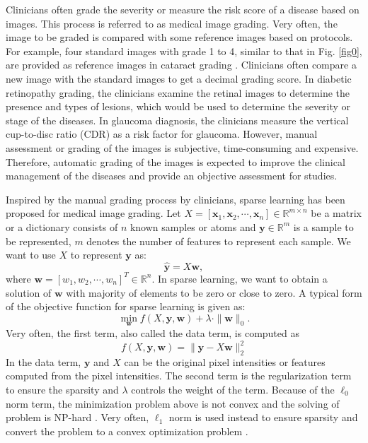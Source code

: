 \documentclass[journal]{IEEEtran}
\begin{document}
  Clinicians  often   grade the severity or measure the risk score of a disease  based on images. This process is referred to as medical image grading.  Very often, the image to be graded is compared with some reference images  based on protocols. For example, four standard images with grade 1 to 4, similar to that in Fig. \ref{fig0}, are provided as reference images in cataract grading \cite{Xu13}. Clinicians often compare a new image with  the standard images to get a decimal grading score. In diabetic retinopathy grading, the clinicians  examine the retinal images to determine the presence and types of  lesions, which would be used to determine the  severity or stage of the diseases. In glaucoma diagnosis, the clinicians measure the vertical cup-to-disc ratio (CDR) as a risk factor for glaucoma.   However, manual assessment or grading of the images is subjective, time-consuming and expensive. Therefore, automatic grading of the images is expected to improve the clinical management of the  diseases and provide an objective assessment for studies.  
  
   
  Inspired by the manual grading process by clinicians, sparse learning has been proposed for medical image grading. 
  Let $X=[\textbf{x}_1, \textbf{x}_2,\cdots, \textbf{x}_n]\in \mathbb{R}^{m\times n}$ be a matrix or a dictionary consists of  $n$ known samples or atoms and $\textbf{y}\in \mathbb{R}^m$ is a sample to be represented, $m$ denotes the number of features to represent each sample.   We want to use $X$ to represent $\textbf{y}$ as:
  \begin{equation}
  \hat{\textbf{y}}=X\textbf{w}, \label{eq1}
  \end{equation} 
  where $\textbf{w} = [w_1, w_2, \cdots, w_n]^T\in \mathbb{R}^n$. In sparse learning, we want to obtain a solution of $\textbf{w}$ with majority of elements to be zero or close to zero. 
  A typical form of the objective function for sparse learning is given as:
   \begin{equation}
    \min_{\textbf{w}} f(X,\textbf{y},\textbf{w}) +\lambda \cdot \|\textbf{w}\|_0.  \label{eq2}
  \end{equation} 
    Very often, the first term,  also called the data term, is computed as 
  \begin{equation}
  f(X, \textbf{y}, \textbf{w})= \|\textbf{y}-X\textbf{w}\|^2_2 \label{eq3}
  \end{equation}
  In the data term, $\textbf{y}$ and $X$ can be the original pixel intensities or features computed from the pixel intensities. 
     The second term is the regularization term to ensure the sparsity and   $\lambda$ controls the weight of the term.
  Because of the  $\ell_0$ norm term, the minimization problem above is not convex and the solving of problem is NP-hard \cite{6873279}.  Very often, $\ell_1$ norm is used instead  to ensure sparsity  and convert the problem to a convex optimization problem \cite{CPA:CPA20132}. 
   
\end{document}
